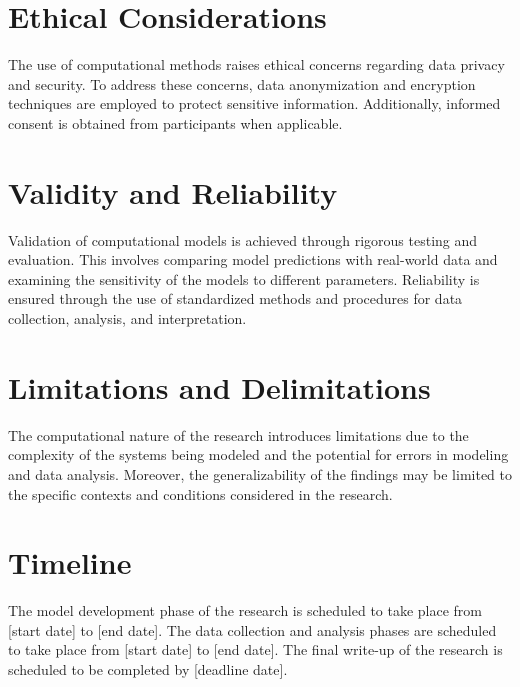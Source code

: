 \section{Ethical Considerations}

The use of computational methods raises ethical concerns regarding data privacy and security. To address these concerns, data anonymization and encryption techniques are employed to protect sensitive information. Additionally, informed consent is obtained from participants when applicable.

\section{Validity and Reliability}

Validation of computational models is achieved through rigorous testing and evaluation. This involves comparing model predictions with real-world data and examining the sensitivity of the models to different parameters. Reliability is ensured through the use of standardized methods and procedures for data collection, analysis, and interpretation.

\section{Limitations and Delimitations}

The computational nature of the research introduces limitations due to the complexity of the systems being modeled and the potential for errors in modeling and data analysis. Moreover, the generalizability of the findings may be limited to the specific contexts and conditions considered in the research.

\section{Timeline}

The model development phase of the research is scheduled to take place from [start date] to [end date]. The data collection and analysis phases are scheduled to take place from [start date] to [end date]. The final write-up of the research is scheduled to be completed by [deadline date].